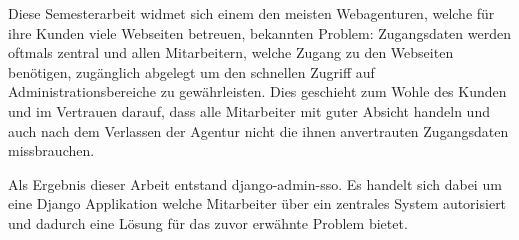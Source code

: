 Diese Semesterarbeit widmet sich einem den meisten Webagenturen, welche für ihre Kunden viele Webseiten betreuen, bekannten Problem: Zugangsdaten werden oftmals zentral und allen Mitarbeitern, welche Zugang zu den Webseiten benötigen, zugänglich abgelegt um den schnellen Zugriff auf Administrationsbereiche zu gewährleisten. Dies geschieht zum Wohle des Kunden und im Vertrauen darauf, dass alle Mitarbeiter mit guter Absicht handeln und auch nach dem Verlassen der Agentur nicht die ihnen anvertrauten Zugangsdaten missbrauchen.

Als Ergebnis dieser Arbeit entstand django-admin-sso. Es handelt sich dabei um eine Django Applikation welche Mitarbeiter über ein zentrales System autorisiert und dadurch eine Lösung für das zuvor erwähnte Problem bietet.
